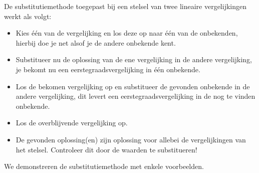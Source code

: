 De substitutiemethode toegepast bij een stelsel van twee lineaire vergelijkingen werkt als volgt:
\begin{itemize}
\item Kies \'{e}\'{e}n van de vergelijking en los deze op naar \'{e}\'{e}n van de onbekenden, hierbij doe je net alsof je de andere onbekende kent.
\item Substitueer nu de oplossing van de ene vergelijking in de andere vergelijking, je bekomt nu een eerstegraadsvergelijking in \'{e}\'{e}n onbekende.
\item Los de bekomen vergelijking op en substitueer de gevonden onbekende in de andere vergelijking, dit levert een eerstegraadsvergelijking in de nog te vinden onbekende.
\item Los de overblijvende vergelijking op.
\item De gevonden oplossing(en) zijn oplossing voor allebei de vergelijkingen van het stelsel. Controleer dit door de waarden te substitueren!
\end{itemize}

We demonstreren de substitutiemethode met enkele voorbeelden.\\

